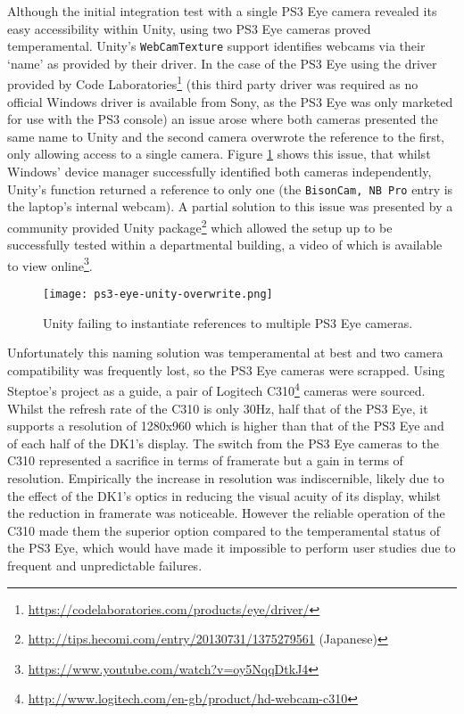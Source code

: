 Although the initial integration test with a single PS3 Eye camera revealed its easy accessibility within Unity, using two PS3 Eye cameras proved temperamental. Unity's \texttt{WebCamTexture} support identifies webcams via their `name' as provided by their driver. In the case of the PS3 Eye using the driver provided by Code Laboratories\footnote{\url{https://codelaboratories.com/products/eye/driver/}} (this third party driver was required as no official Windows driver is available from Sony, as the PS3 Eye was only marketed for use with the PS3 console) an issue arose where both cameras presented the same name to Unity and the second camera overwrote the reference to the first, only allowing access to a single camera. Figure \ref{ps3-eye-unity-overwrite.png} shows this issue, that whilst Windows' device manager successfully identified both cameras independently, Unity's  function returned a reference to only one (the \texttt{BisonCam, NB Pro} entry is the laptop's internal webcam). A partial solution to this issue was presented by a community provided Unity package\footnote{\url{http://tips.hecomi.com/entry/20130731/1375279561} (Japanese)} which allowed the setup up to be successfully tested within a departmental building, a video of which is available to view online\footnote{\url{https://www.youtube.com/watch?v=oy5NqqDtkJ4}}.

\begin{figure}[h]
	\begin{center}
		\texttt{[image: ps3-eye-unity-overwrite.png]}
		\caption{Unity failing to instantiate references to multiple PS3 Eye cameras.}
		\label{ps3-eye-unity-overwrite.png}
	\end{center}
\end{figure}

Unfortunately this naming solution was temperamental at best and two camera compatibility was frequently lost, so the PS3 Eye cameras were scrapped. Using Steptoe's project as a guide, a pair of Logitech C310\footnote{\url{http://www.logitech.com/en-gb/product/hd-webcam-c310}} cameras were sourced. Whilst the refresh rate of the C310 is only 30Hz, half that of the PS3 Eye, it supports a resolution of 1280x960 which is higher than that of the PS3 Eye and of each half of the DK1's display. The switch from the PS3 Eye cameras to the C310 represented a sacrifice in terms of framerate but a gain in terms of resolution. Empirically the increase in resolution was indiscernible, likely due to the effect of the DK1's optics in reducing the visual acuity of its display, whilst the reduction in framerate was noticeable. However the reliable operation of the C310 made them the superior option compared to the temperamental status of the PS3 Eye, which would have made it impossible to perform user studies due to frequent and unpredictable failures.

